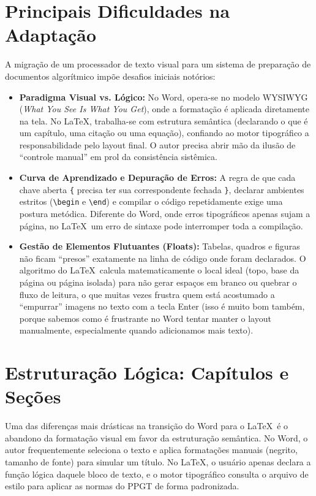 \documentclass[a4paper,12pt]{article}
\begin{document}
\section{Principais Dificuldades na Adaptação}

A migração de um processador de texto visual para um sistema de preparação de documentos algorítmico impõe desafios iniciais notórios:

\begin{itemize}
    \item \textbf{Paradigma Visual vs. Lógico:} No Word, opera-se no modelo WYSIWYG (\textit{What You See Is What You Get}), onde a formatação é aplicada diretamente na tela. No \LaTeX, trabalha-se com estrutura semântica (declarando o que é um capítulo, uma citação ou uma equação), confiando ao motor tipográfico a responsabilidade pelo layout final. O autor precisa abrir mão da ilusão de ``controle manual'' em prol da consistência sistêmica.
    \item \textbf{Curva de Aprendizado e Depuração de Erros:} A regra de que cada chave aberta \texttt{\{} precisa ter sua correspondente fechada \texttt{\}}, declarar ambientes estritos (\texttt{\textbackslash begin} e \texttt{\textbackslash end}) e compilar o código repetidamente exige uma postura metódica. Diferente do Word, onde erros tipográficos apenas sujam a página, no \LaTeX \ um erro de sintaxe pode interromper toda a compilação.
    \item \textbf{Gestão de Elementos Flutuantes (Floats):} Tabelas, quadros e figuras não ficam ``presos'' exatamente na linha de código onde foram declarados. O algoritmo do \LaTeX \ calcula matematicamente o local ideal (topo, base da página ou página isolada) para não gerar espaços em branco ou quebrar o fluxo de leitura, o que muitas vezes frustra quem está acostumado a ``empurrar'' imagens no texto com a tecla Enter (isso é muito bom também, porque sabemos como é frustrante no Word tentar manter o layout manualmente, especialmente quando adicionamos mais texto).
\end{itemize}

\section{Estruturação Lógica: Capítulos e Seções}

Uma das diferenças mais drásticas na transição do Word para o \LaTeX \ é o abandono da formatação visual em favor da estruturação semântica. No Word, o autor frequentemente seleciona o texto e aplica formatações manuais (negrito, tamanho de fonte) para simular um título. No \LaTeX, o usuário apenas declara a função lógica daquele bloco de texto, e o motor tipográfico consulta o arquivo de estilo para aplicar as normas do PPGT de forma padronizada.
\end{document}
